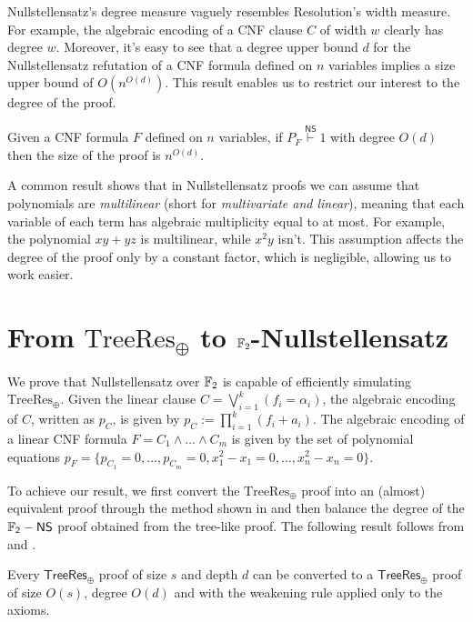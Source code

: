 Nullstellensatz's degree measure vaguely resembles Resolution's width measure. For example, the algebraic encoding of a CNF clause $C$ of width $w$ clearly has degree $w$. Moreover, it's easy to see that a degree upper bound $d$ for the Nullstellensatz refutation of a CNF formula defined on $n$ variables implies a size upper bound of $O(n^{O(d)})$. This result enables us to restrict our interest to the degree of the proof.

\begin{proposition}
 Given a CNF formula $F$ defined on $n$ variables, if $P_F \stackrel{\mathsf{NS}}{\vdash} 1$ with degree $O(d)$ then the size of the proof is $n^{O(d)}$.
\end{proposition}

A common result shows that in Nullstellensatz proofs we can assume that polynomials are \textit{multilinear} (short for \textit{multivariate and linear}), meaning that each variable of each term has algebraic multiplicity equal to at most. For example, the polynomial $xy+yz$ is multilinear, while $x^2y$ isn't. This assumption affects the degree of the proof only by a constant factor, which is negligible, allowing us to work easier.


\section{From $\mathrm{TreeRes}_\oplus$ to $\mathbb{F}_2$-Nullstellensatz}

We prove that Nullstellensatz over $\mathbb{F}_2$ is capable of efficiently simulating $\mathrm{TreeRes}_\oplus$. Given the linear clause $C = \bigvee_{i = 1}^k (f_i = \alpha_i)$, the algebraic encoding of $C$, written as $p_C$, is given by $p_C := \prod_{i = 1}^{k} (f_i + a_i)$. The algebraic encoding of a linear CNF formula $F = C_1 \land \ldots \land C_m$ is given by the set of polynomial equations $p_F = \{p_{C_1} = 0, \ldots, p_{C_m} = 0, x_1^2-x_1 = 0, \ldots, x_n^2-x_n = 0\}$.

To achieve our result, we first convert the $\mathrm{TreeRes}_\oplus$ proof into an (almost) equivalent proof through the method shown in  and then balance the degree of the $\mathsf{\mathbb{F}_2-NS}$ proof obtained from the tree-like proof. The following result follows from  and .

\begin{corollary}
    \label{leaf_weakening}
 Every $\mathsf{TreeRes}_{\oplus}$ proof of size $s$ and depth $d$ can be converted to a $\mathsf{TreeRes}_{\oplus}$ proof of size $O(s)$, degree $O(d)$ and with the weakening rule applied only to the axioms.
\end{corollary}

